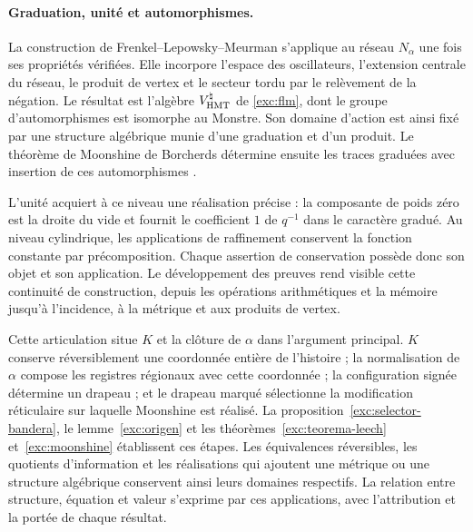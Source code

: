 \paragraph{Graduation, unité et automorphismes.}
\label{inc-ampl-automorfismos}
La construction de Frenkel--Lepowsky--Meurman s'applique au réseau
$N_\alpha$ une fois ses propriétés vérifiées. Elle incorpore l'espace
des oscillateurs, l'extension centrale du réseau, le produit de vertex
et le secteur tordu par le relèvement de la négation. Le résultat est
l'algèbre $V^\natural_{\rm HMT}$ de \eqref{exc:flm}, dont le groupe
d'automorphismes est isomorphe au Monstre. Son domaine d'action est ainsi
fixé par une structure algébrique munie d'une graduation et d'un produit. Le théorème
de Moonshine de Borcherds détermine ensuite les traces graduées
avec insertion de ces automorphismes \cite{flm,borcherds}.

L'unité acquiert à ce niveau une réalisation précise : la composante
de poids zéro est la droite du vide et fournit le coefficient $1$ de
$q^{-1}$ dans le caractère gradué. Au niveau cylindrique, les
applications de raffinement conservent la fonction constante par
précomposition. Chaque assertion de conservation possède donc son
objet et son application. Le développement des preuves rend visible cette
continuité de construction, depuis les opérations arithmétiques et la
mémoire jusqu'à l'incidence, à la métrique et aux produits de vertex.

Cette articulation situe $K$ et la clôture de $\alpha$ dans l’argument
principal. $K$ conserve réversiblement une coordonnée entière de
l’histoire ; la normalisation de $\alpha$ compose les registres régionaux
avec cette coordonnée ; la configuration signée détermine un drapeau ; et
le drapeau marqué sélectionne la modification réticulaire sur laquelle
Moonshine est réalisé. La proposition~\ref{exc:selector-bandera},
le lemme~\ref{exc:origen} et les théorèmes~\ref{exc:teorema-leech}
et~\ref{exc:moonshine} établissent ces étapes. Les équivalences
réversibles, les quotients d’information et les réalisations qui ajoutent
une métrique ou une structure algébrique conservent ainsi leurs domaines respectifs.
La relation entre structure, équation et valeur s’exprime par ces
applications, avec l’attribution et la portée de chaque résultat.
